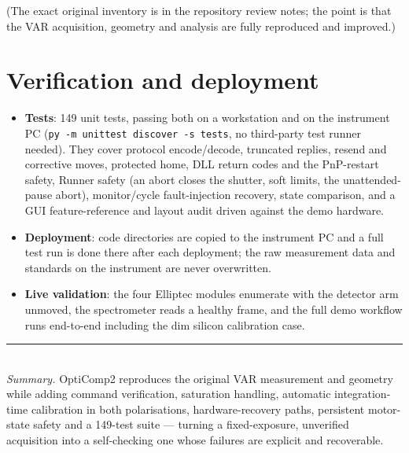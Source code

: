 \documentclass[11pt]{article}
\newcommand{\code}[1]{\texttt{\small #1}}
\begin{document}
\noindent (The exact original inventory is in the repository review notes; the point is that the VAR
acquisition, geometry and analysis are fully reproduced and improved.)

\section{Verification and deployment}

\begin{itemize}
\item \textbf{Tests}: 149 unit tests, passing both on a workstation and on the instrument PC
(\code{py -m unittest discover -s tests}, no third-party test runner needed). They cover protocol
encode/decode, truncated replies, resend and corrective moves, protected home, DLL return codes and
the PnP-restart safety, Runner safety (an abort closes the shutter, soft limits, the unattended-pause
abort), monitor/cycle fault-injection recovery, state comparison, and a GUI feature-reference and
layout audit driven against the demo hardware.
\item \textbf{Deployment}: code directories are copied to the instrument PC and a full test run is
done there after each deployment; the raw measurement data and standards on the instrument are never
overwritten.
\item \textbf{Live validation}: the four Elliptec modules enumerate with the detector arm unmoved, the
spectrometer reads a healthy frame, and the full demo workflow runs end-to-end including the dim
silicon calibration case.
\end{itemize}

\vspace{1em}
\noindent\rule{\linewidth}{0.4pt}\\[4pt]
\small\emph{Summary.} OptiComp2 reproduces the original VAR measurement and geometry while adding
command verification, saturation handling, automatic integration-time calibration in both
polarisations, hardware-recovery paths, persistent motor-state safety and a 149-test suite ---
turning a fixed-exposure, unverified acquisition into a self-checking one whose failures are explicit
and recoverable.
\end{document}
